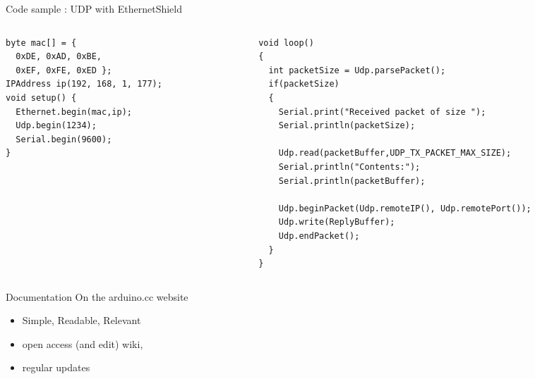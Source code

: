 \begin{frame}[containsverbatim]{Code sample : UDP with EthernetShield }
	\begin{columns}[c]
		\begin{column}[c]{.4\textwidth}

\begin{Verbatim}[fontsize=\scriptsize]
byte mac[] = {
  0xDE, 0xAD, 0xBE, 
  0xEF, 0xFE, 0xED };
IPAddress ip(192, 168, 1, 177);
void setup() {
  Ethernet.begin(mac,ip);
  Udp.begin(1234);
  Serial.begin(9600);
}
\end{Verbatim}

		\end{column}
		\begin{column}[c]{.8\textwidth}

\begin{Verbatim}[fontsize=\scriptsize]
void loop()
{
  int packetSize = Udp.parsePacket();
  if(packetSize)
  {
    Serial.print("Received packet of size ");
    Serial.println(packetSize);
  
    Udp.read(packetBuffer,UDP_TX_PACKET_MAX_SIZE);
    Serial.println("Contents:");
    Serial.println(packetBuffer);
  
    Udp.beginPacket(Udp.remoteIP(), Udp.remotePort());
    Udp.write(ReplyBuffer);
    Udp.endPacket();
  }
}
\end{Verbatim}

		\end{column}
	\end{columns}
\end{frame}


\begin{frame}{Documentation}
	On the arduino.cc website
	\begin{itemize}
		\item Simple, Readable, Relevant 
		\item open access (and edit) wiki, 
		\item regular updates
	\end{itemize}
\end{frame}

